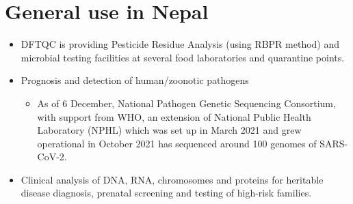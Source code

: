 \documentclass[
  ignorenonframetext,
  aspectratio=169]{beamer}
\providecommand{\tightlist}{%
  \setlength{\itemsep}{0pt}\setlength{\parskip}{0pt}}
\begin{document}
\hypertarget{general-use-in-nepal}{%
\section{General use in Nepal}\label{general-use-in-nepal}}

\begin{frame}{}
\protect\hypertarget{section-3}{}
\begin{itemize}
\tightlist
\item
  DFTQC is providing Pesticide Residue Analysis (using RBPR method) and
  microbial testing facilities at several food laboratories and
  quarantine points.
\item
  Prognosis and detection of human/zoonotic pathogens

  \begin{itemize}
  \tightlist
  \item
    As of 6 December, National Pathogen Genetic Sequencing Consortium,
    with support from WHO, an extension of National Public Health
    Laboratory (NPHL) which was set up in March 2021 and grew
    operational in October 2021 has sequenced around 100 genomes of
    SARS-CoV-2.
  \end{itemize}
\item
  Clinical analysis of DNA, RNA, chromosomes and proteins for heritable
  disease diagnosis, prenatal screening and testing of high-risk
  families.
\end{itemize}
\end{frame}
\end{document}
